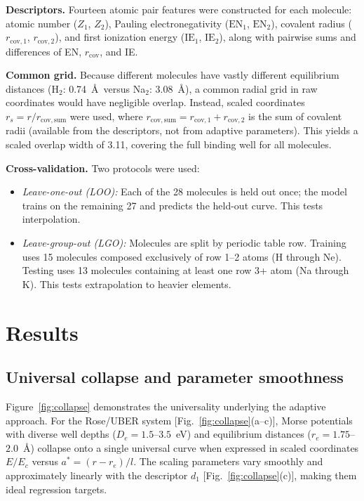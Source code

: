 \documentclass[aps,prb,twocolumn,superscriptaddress,longbibliography,floatfix]{revtex4-2}
\begin{document}
\textbf{Descriptors.} Fourteen atomic pair features were constructed for each molecule: atomic number ($Z_1$, $Z_2$), Pauling electronegativity ($\mathrm{EN}_1$, $\mathrm{EN}_2$), covalent radius ($r_{\mathrm{cov},1}$, $r_{\mathrm{cov},2}$), and first ionization energy ($\mathrm{IE}_1$, $\mathrm{IE}_2$), along with pairwise sums and differences of EN, $r_\mathrm{cov}$, and IE.

\textbf{Common grid.} Because different molecules have vastly different equilibrium distances (H$_2$: 0.74~\AA\ versus Na$_2$: 3.08~\AA), a common radial grid in raw coordinates would have negligible overlap. Instead, scaled coordinates $r_s = r / r_{\mathrm{cov,sum}}$ were used, where $r_{\mathrm{cov,sum}} = r_{\mathrm{cov},1} + r_{\mathrm{cov},2}$ is the sum of covalent radii (available from the descriptors, not from adaptive parameters). This yields a scaled overlap width of 3.11, covering the full binding well for all molecules.

\textbf{Cross-validation.} Two protocols were used:
\begin{itemize}
  \item \emph{Leave-one-out (LOO):} Each of the 28 molecules is held out once; the model trains on the remaining 27 and predicts the held-out curve. This tests interpolation.
  \item \emph{Leave-group-out (LGO):} Molecules are split by periodic table row. Training uses 15 molecules composed exclusively of row 1--2 atoms (H through Ne). Testing uses 13 molecules containing at least one row 3+ atom (Na through K). This tests extrapolation to heavier elements.
\end{itemize}


\section{Results}
\label{sec:results}

\subsection{Universal collapse and parameter smoothness}
\label{sec:collapse}

Figure~\ref{fig:collapse} demonstrates the universality underlying the adaptive approach. For the Rose/UBER system [Fig.~\ref{fig:collapse}(a--c)], Morse potentials with diverse well depths ($D_e = 1.5$--$3.5$~eV) and equilibrium distances ($r_e = 1.75$--$2.0$~\AA) collapse onto a single universal curve when expressed in scaled coordinates $E/E_c$ versus $a^* = (r - r_e)/l$. The scaling parameters vary smoothly and approximately linearly with the descriptor $d_1$ [Fig.~\ref{fig:collapse}(c)], making them ideal regression targets.
\end{document}
